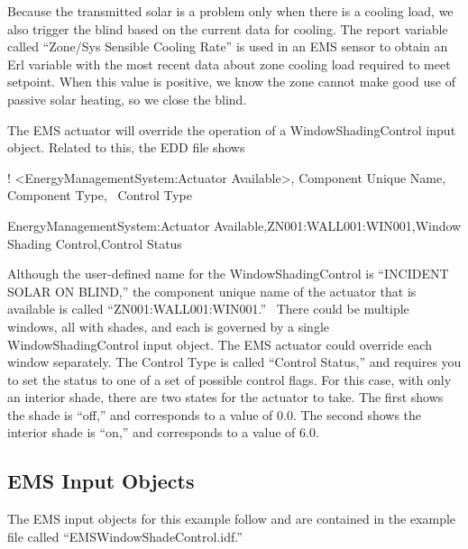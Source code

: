 Because the transmitted solar is a problem only when there is a cooling load, we also trigger the blind based on the current data for cooling. The report variable called ``Zone/Sys Sensible Cooling Rate'' is used in an EMS sensor to obtain an Erl variable with the most recent data about zone cooling load required to meet setpoint. When this value is positive, we know the zone cannot make good use of passive solar heating, so we close the blind.

The EMS actuator will override the operation of a WindowShadingControl input object. Related to this, the EDD file shows

! \textless{}EnergyManagementSystem:Actuator Available\textgreater{}, Component Unique Name, Component Type,~ Control Type

EnergyManagementSystem:Actuator Available,ZN001:WALL001:WIN001,Window Shading Control,Control Status

Although the user-defined name for the WindowShadingControl is ``INCIDENT SOLAR ON BLIND,'' the component unique name of the actuator that is available is called ``ZN001:WALL001:WIN001.''~ There could be multiple windows, all with shades, and each is governed by a single WindowShadingControl input object. The EMS actuator could override each window separately. The Control Type is called ``Control Status,'' and requires you to set the status to one of a set of possible control flags. For this case, with only an interior shade, there are two states for the actuator to take. The first shows the shade is ``off,'' and corresponds to a value of 0.0. The second shows the interior shade is ``on,'' and corresponds to a value of 6.0.

\subsection{EMS Input Objects}\label{ems-input-objects-008}

The EMS input objects for this example follow and are contained in the example file called ``EMSWindowShadeControl.idf.''

